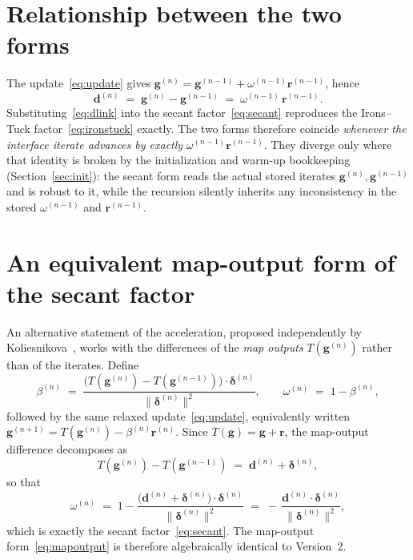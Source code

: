 \documentclass[11pt]{article}
\begin{document}
\section{Relationship between the two forms}
\label{sec:equiv}

The update~\eqref{eq:update} gives
$\bm{g}^{(n)} = \bm{g}^{(n-1)} + \omega^{(n-1)}\bm{r}^{(n-1)}$, hence
\begin{equation}
    \bm{d}^{(n)} \;=\; \bm{g}^{(n)} - \bm{g}^{(n-1)}
                 \;=\; \omega^{(n-1)}\,\bm{r}^{(n-1)} .
    \label{eq:dlink}
\end{equation}
Substituting~\eqref{eq:dlink} into the secant factor~\eqref{eq:secant}
reproduces the Irons--Tuck factor~\eqref{eq:ironstuck} exactly. The two forms
therefore coincide \emph{whenever the interface iterate advances by exactly}
$\omega^{(n-1)}\bm{r}^{(n-1)}$. They diverge only where that identity is broken
by the initialization and warm-up bookkeeping (Section~\ref{sec:init}): the
secant form reads the actual stored iterates $\bm{g}^{(n)},\bm{g}^{(n-1)}$ and
is robust to it, while the recursion silently inherits any inconsistency in the
stored $\omega^{(n-1)}$ and $\bm{r}^{(n-1)}$.

\section{An equivalent map-output form of the secant factor}
\label{sec:mapoutput}

An alternative statement of the acceleration, proposed independently by
Koliesnikova~\cite{Koliesnikova}, works with the differences of the
\emph{map outputs} $T(\bm{g}^{(n)})$ rather than of the iterates. Define
\begin{equation}
    \beta^{(n)} \;=\;
    \frac{\bigl(T(\bm{g}^{(n)}) - T(\bm{g}^{(n-1)})\bigr)\cdot\bm{\delta}^{(n)}}
         {\bigl\lVert \bm{\delta}^{(n)} \bigr\rVert^{2}},
    \qquad
    \omega^{(n)} \;=\; 1 - \beta^{(n)},
    \label{eq:mapoutput}
\end{equation}
followed by the same relaxed update~\eqref{eq:update}, equivalently written
$\bm{g}^{(n+1)} = T(\bm{g}^{(n)}) - \beta^{(n)}\bm{r}^{(n)}$. Since
$T(\bm{g}) = \bm{g} + \bm{r}$, the map-output difference decomposes as
\begin{equation}
    T(\bm{g}^{(n)}) - T(\bm{g}^{(n-1)})
    \;=\; \bm{d}^{(n)} + \bm{\delta}^{(n)},
    \label{eq:Tdecomp}
\end{equation}
so that
\begin{equation*}
    \omega^{(n)} \;=\; 1 -
    \frac{\bigl(\bm{d}^{(n)} + \bm{\delta}^{(n)}\bigr)\cdot\bm{\delta}^{(n)}}
         {\lVert \bm{\delta}^{(n)} \rVert^{2}}
    \;=\; -\,\frac{\bm{d}^{(n)}\cdot\bm{\delta}^{(n)}}
                  {\lVert \bm{\delta}^{(n)} \rVert^{2}} ,
\end{equation*}
which is exactly the secant factor~\eqref{eq:secant}. The map-output
form~\eqref{eq:mapoutput} is therefore algebraically identical to
Version~2.
\end{document}
